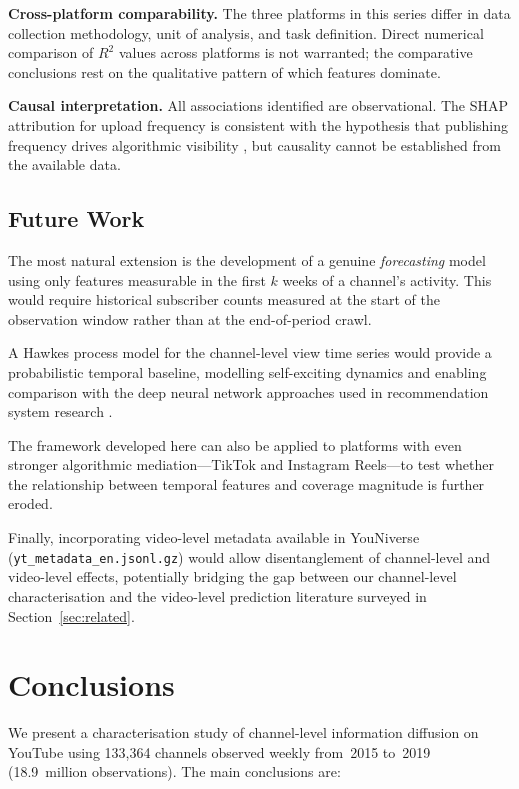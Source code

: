 \documentclass[journal,article,submit,pdftex,moreauthors]{Definitions/mdpi}
\begin{document}
\textbf{Cross-platform comparability.}
The three platforms in this series differ in data collection
methodology, unit of analysis, and task definition.
Direct numerical comparison of $R^2$ values across platforms is not
warranted; the comparative conclusions rest on the qualitative pattern
of which features dominate.

\textbf{Causal interpretation.}
All associations identified are observational.
The SHAP attribution for upload frequency is consistent with the
hypothesis that publishing frequency drives algorithmic visibility
\cite{ref-covington2016}, but causality cannot be established from
the available data.

\subsection{Future Work}

The most natural extension is the development of a genuine
\emph{forecasting} model using only features measurable in the first
$k$ weeks of a channel's activity.
This would require historical subscriber counts measured at the start
of the observation window rather than at the end-of-period crawl.

A Hawkes process model \cite{ref-hawkes1971} for the channel-level
view time series would provide a probabilistic temporal baseline,
modelling self-exciting dynamics and enabling comparison with the
deep neural network approaches used in recommendation system research
\cite{ref-covington2016}.

The framework developed here can also be applied to platforms with even
stronger algorithmic mediation---TikTok and Instagram Reels---to test
whether the relationship between temporal features and coverage magnitude
is further eroded.

Finally, incorporating video-level metadata available in YouNiverse
(\texttt{yt\_metadata\_en.jsonl.gz}) would allow disentanglement of
channel-level and video-level effects, potentially bridging the gap
between our channel-level characterisation and the video-level
prediction literature surveyed in Section~\ref{sec:related}.

\section{Conclusions}
\label{sec:conclusions}

We present a characterisation study of channel-level information diffusion
on YouTube using 133,364 channels observed weekly from~2015 to~2019
(18.9~million observations).
The main conclusions are:
\end{document}
